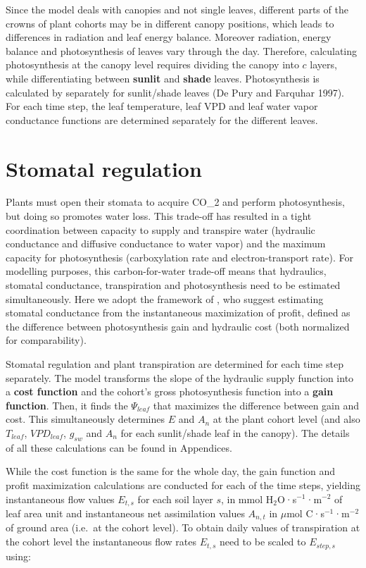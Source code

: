 \documentclass[]{book}
\begin{document}
Since the model deals with canopies and not single leaves, different
parts of the crowns of plant cohorts may be in different canopy
positions, which leads to differences in radiation and leaf energy
balance. Moreover radiation, energy balance and photosynthesis of leaves
vary through the day. Therefore, calculating photosynthesis at the
canopy level requires dividing the canopy into \(c\) layers, while
differentiating between \textbf{sunlit} and \textbf{shade} leaves.
Photosynthesis is calculated by separately for sunlit/shade leaves (De
Pury and Farquhar 1997). For each time step, the leaf temperature, leaf
VPD and leaf water vapor conductance functions are determined separately
for the different leaves.

\section{Stomatal regulation}\label{stomatal-regulation-1}

Plants must open their stomata to acquire CO\_2 and perform
photosynthesis, but doing so promotes water loss. This trade-off has
resulted in a tight coordination between capacity to supply and
transpire water (hydraulic conductance and diffusive conductance to
water vapor) and the maximum capacity for photosynthesis (carboxylation
rate and electron-transport rate). For modelling purposes, this
carbon-for-water trade-off means that hydraulics, stomatal conductance,
transpiration and photosynthesis need to be estimated simultaneously.
Here we adopt the framework of \citet{Sperry2016}, who suggest
estimating stomatal conductance from the instantaneous maximization of
profit, defined as the difference between photosynthesis gain and
hydraulic cost (both normalized for comparability).

Stomatal regulation and plant transpiration are determined for each time
step separately. The model transforms the slope of the hydraulic supply
function into a \textbf{cost function} and the cohort's gross
photosynthesis function into a \textbf{gain function}. Then, it finds
the \(\Psi_{leaf}\) that maximizes the difference between gain and cost.
This simultaneously determines \(E\) and \(A_n\) at the plant cohort
level (and also \(T_{leaf}\), \(VPD_{leaf}\), \(g_{sw}\) and \(A_{n}\)
for each sunlit/shade leaf in the canopy). The details of all these
calculations can be found in Appendices.

While the cost function is the same for the whole day, the gain function
and profit maximization calculations are conducted for each of the time
steps, yielding instantaneous flow values \(E_{t, s}\) for each soil
layer \(s\), in mmol H\(_2\)O·s\(^{-1}\)·m\(^{-2}\) of leaf area unit
and instantaneous net assimilation values \(A_{n,t}\) in \(\mu\)mol
C·s\(^{-1}\)·m\(^{-2}\) of ground area (i.e.~at the cohort level). To
obtain daily values of transpiration at the cohort level the
instantaneous flow rates \(E_{t, s}\) need to be scaled to
\(E_{step,s}\) using:
\end{document}

